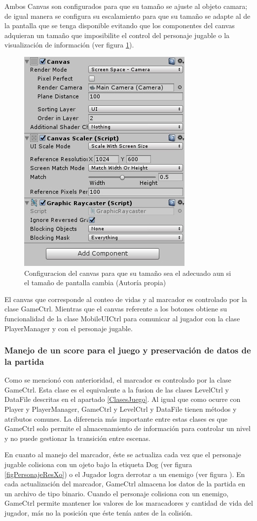 Ambos Canvas son configurados para que su tamaño se ajuste al objeto camara; de
 igual manera se configura su escalamiento para que su tamaño se adapte al de la
  pantalla que se tenga disponible evitando que los componentes del canvas 
  adquieran un tamaño que imposibilite el control del personaje jugable o la 
  visualización de información (ver figura \ref{figCanvasConf}).    
 \\
 \par
 \begin{figure}
  \centering
   \includegraphics[width=0.4 \textwidth]{05TrabajoRealizado/03Unity/imagenes/02ConfiguracionCanvas}
  \caption{Configuracion del canvas para que su tamaño sea el adecuado aun si el tamaño de pantalla cambia (Autoría propia)}
  \label{figCanvasConf}
\end{figure}
 El canvas que corresponde al conteo de vidas y al marcador es controlado por  
 la clase GameCtrl. Mientras que el canvas referente a los botones obtiene su  
 funcionalidad de la clase MobileUICtrl para comunicar al jugador con la clase 
 PlayerManager y con el personaje jugable.  
 
 \subsubsection{Manejo de un score para el juego y preservación de datos de la partida}
Como se mencionó con anterioridad, el marcador es controlado por la clase GameCtrl. 
Esta clase es el equivalente a la fusion de las clases LevelCtrl y DataFile 
descritas en el apartado \ref{ClasesJuego}. Al igual que como ocurre con Player 
y PlayerManager, GameCtrl y LevelCtrl y DataFile tienen métodos y atributos 
comunes. La diferencia más importante entre estas clases es que GameCtrl solo 
permite el almacenamiento de información para controlar un nivel y no puede 
gestionar la transición entre escenas. 
\\
\par
En cuanto al manejo del marcador, éste se actualiza cada vez que el personaje jugable 
colisiona con un ojeto bajo la etiqueta Dog (ver figura \ref{figPersonajeResXo}) o el 
Jugador logra derrotar a un enemigo (ver figura ). En cada actualización del marcador, 
GameCtrl almacena los datos de la partida en un archivo de tipo binario. Cuando el 
personaje colisiona con un enemigo, GameCtrl permite mantener los valores de los 
maracadores y cantidad de vida del jugador, más no la posición que éste tenía antes 
de la colisión.   
 
